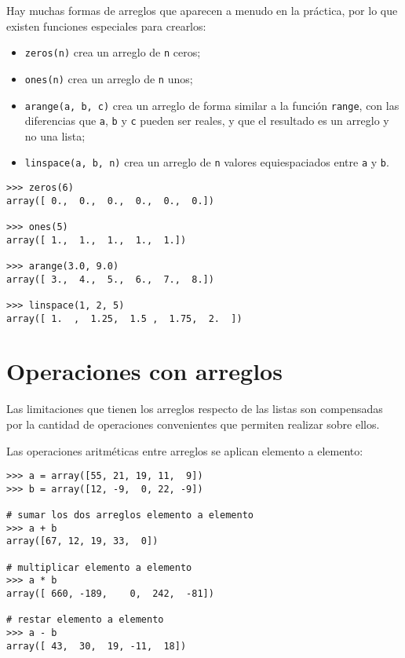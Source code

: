 Hay muchas formas de arreglos que aparecen a menudo en la práctica, por
lo que existen funciones especiales para crearlos:

\begin{itemize}
\item
  \lstinline!zeros(n)! crea un arreglo de \lstinline!n! ceros;
\item
  \lstinline!ones(n)! crea un arreglo de \lstinline!n! unos;
\item
  \lstinline!arange(a, b, c)! crea un arreglo de forma similar a la
  función \lstinline!range!, con las diferencias que \lstinline!a!,
  \lstinline!b! y \lstinline!c! pueden ser reales, y que el resultado es
  un arreglo y no una lista;
\item
  \lstinline!linspace(a, b, n)! crea un arreglo de \lstinline!n! valores
  equiespaciados entre \lstinline!a! y \lstinline!b!.
\end{itemize}

\begin{lstlisting}
>>> zeros(6)
array([ 0.,  0.,  0.,  0.,  0.,  0.])

>>> ones(5)
array([ 1.,  1.,  1.,  1.,  1.])

>>> arange(3.0, 9.0)
array([ 3.,  4.,  5.,  6.,  7.,  8.])

>>> linspace(1, 2, 5)
array([ 1.  ,  1.25,  1.5 ,  1.75,  2.  ])
\end{lstlisting}

\section{Operaciones con arreglos}

Las limitaciones que tienen los arreglos respecto de las listas son
compensadas por la cantidad de operaciones convenientes que permiten
realizar sobre ellos.

Las operaciones aritméticas entre arreglos se aplican elemento a
elemento:

\begin{lstlisting}
>>> a = array([55, 21, 19, 11,  9])
>>> b = array([12, -9,  0, 22, -9])

# sumar los dos arreglos elemento a elemento
>>> a + b
array([67, 12, 19, 33,  0])

# multiplicar elemento a elemento
>>> a * b
array([ 660, -189,    0,  242,  -81])

# restar elemento a elemento
>>> a - b
array([ 43,  30,  19, -11,  18])
\end{lstlisting}

